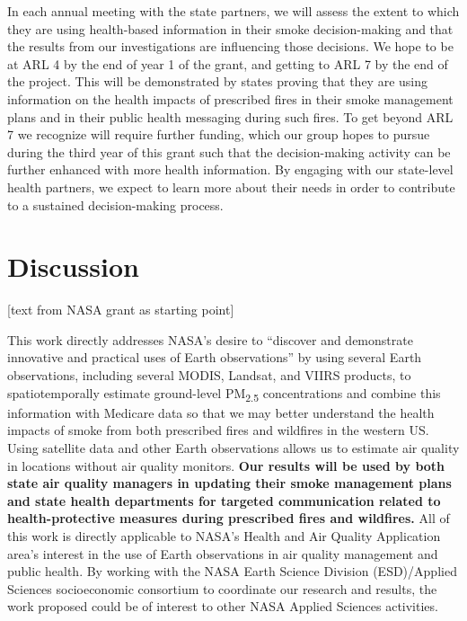 \documentclass[authoryear]{elsarticle}
\begin{document}
In each annual meeting with the state partners, we will assess the extent to which they are using health-based information in their smoke decision-making and that the results from our investigations are influencing those decisions. We hope to be at ARL 4 by the end of year 1 of the grant, and getting to ARL 7 by the end of the project. This will be demonstrated by states proving that they are using information on the health impacts of prescribed fires in their smoke management plans and in their public health messaging during such fires. To get beyond ARL 7 we recognize will require further funding, which our group hopes to pursue during the third year of this grant such that the decision-making activity can be further enhanced with more health information. By engaging with our state-level health partners, we expect to learn more about their needs in order to contribute to a sustained decision-making process.


\section{Discussion}

[text from NASA grant as starting point]

This work directly addresses NASA's desire to ``discover and demonstrate innovative and practical uses of Earth observations'' by using several Earth observations, including several MODIS, Landsat, and VIIRS products, to spatiotemporally estimate ground-level PM\textsubscript{2.5} concentrations and combine this information with Medicare data so that we may better understand the health impacts of smoke from both prescribed fires and wildfires in the western US. Using satellite data and other Earth observations allows us to estimate air quality in locations without air quality monitors. \textbf{Our results will be used by both state air quality managers in updating their smoke management plans and state health departments for targeted communication related to health-protective measures during prescribed fires and wildfires.} All of this work is directly applicable to NASA's Health and Air Quality Application area's interest in the use of Earth observations in air quality management and public health. By working with the NASA Earth Science Division (ESD)/Applied Sciences socioeconomic consortium to coordinate our research and results, the work proposed could be of interest to other NASA Applied Sciences activities.
\end{document}
